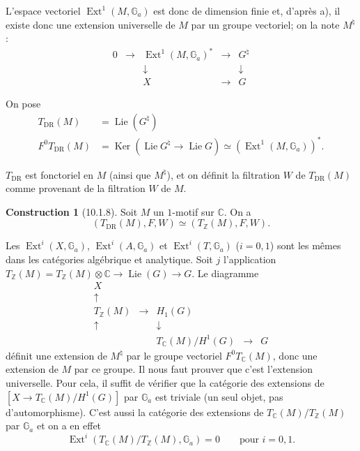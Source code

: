 \documentclass[12pt,a4paper]{amsart}
\theoremstyle{plain}
\theoremstyle{definition}
\newtheorem{construction}[lemme]{Construction}
\theoremstyle{remark}
\DeclareMathOperator{\Ker}{Ker}
\DeclareMathOperator{\Ext}{Ext}
\DeclareMathOperator{\Lie}{Lie}
\numberwithin{equation}{section}
\begin{document}
L'espace vectoriel $\Ext^1(M,\mathbb{G}_a)$ est donc de dimension finie et, d'après a), il existe donc une extension universelle de $M$ par un groupe vectoriel; on la note $M^\natural$ :
\[
\begin{array}{ccccc}
0 & \longrightarrow & \Ext^1(M,\mathbb{G}_a)^* & \longrightarrow & G^\natural \\
 & & \downarrow & & \downarrow \\
 & & X & \longrightarrow & G
\end{array}
\]

On pose
\begin{align*}
T_\mathrm{DR}(M) &= \Lie(G^\natural) \\
F^0T_\mathrm{DR}(M) &= \Ker(\Lie G^\natural \to \Lie G) \simeq (\Ext^1(M,\mathbb{G}_a))^*.
\end{align*}

$T_\mathrm{DR}$ est fonctoriel en $M$ (ainsi que $M^\natural$), et on définit la filtration $W$ de $T_\mathrm{DR}(M)$ comme provenant de la filtration $W$ de $M$.

\begin{construction}[10.1.8]\label{cons:10.1.8}
Soit $M$ un $1$-motif sur $\mathbb{C}$. On a
\[
(T_\mathrm{DR}(M),F,W) \simeq (T_\mathbb{Z}(M),F,W).
\]
\end{construction}

Les $\Ext^i(X,\mathbb{G}_a)$, $\Ext^i(A,\mathbb{G}_a)$ et $\Ext^i(T,\mathbb{G}_a)$ ($i=0,1$) sont les mêmes dans les catégories algébrique et analytique. Soit $j$ l'application $T_\mathbb{Z}(M)=T_\mathbb{Z}(M)\otimes\mathbb{C}\to\Lie(G)\to G$. Le diagramme
\[
\begin{array}{ccccc}
X & & & & \\
\uparrow & & & & \\
T_\mathbb{Z}(M) & \longrightarrow & H_1(G) & & \\
\uparrow & & \downarrow & & \\
 & & T_\mathbb{C}(M)/H^1(G) & \longrightarrow & G
\end{array}
\]
définit une extension de $M^\natural$ par le groupe vectoriel $F^0T_\mathbb{C}(M)$, donc une extension de $M$ par ce groupe. Il nous faut prouver que c'est l'extension universelle. Pour cela, il suffit de vérifier que la catégorie des extensions de $[X\to T_\mathbb{C}(M)/H^1(G)]$ par $\mathbb{G}_a$ est triviale (un seul objet, pas d'automorphisme). C'est aussi la catégorie des extensions de $T_\mathbb{C}(M)/T_\mathbb{Z}(M)$ par $\mathbb{G}_a$ et on a en effet
\[
\Ext^i(T_\mathbb{C}(M)/T_\mathbb{Z}(M),\mathbb{G}_a)=0 \qquad\text{pour } i=0,1.
\]
\end{document}
